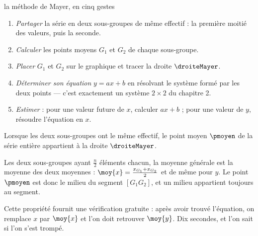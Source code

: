 \begin{methode}{la méthode de Mayer, en cinq gestes}
\begin{enumerate}[label=\textbf{\arabic*.}, leftmargin=*, itemsep=0.15em]
  \item \emph{Partager} la série en deux sous-groupes de même effectif : la
        première moitié des valeurs, puis la seconde.
  \item \emph{Calculer} les points moyens $G_{1}$ et $G_{2}$ de chaque
        sous-groupe.
  \item \emph{Placer} $G_{1}$ et $G_{2}$ sur le graphique et tracer la
        droite $\droiteMayer$.
  \item \emph{Déterminer son équation} $y = ax+b$ en résolvant le système
        formé par les deux points — c'est exactement un système
        $2\times2$ du chapitre 2.
  \item \emph{Estimer} : pour une valeur future de $x$, calculer $ax+b$ ;
        pour une valeur de $y$, résoudre l'équation en $x$.
\end{enumerate}
\end{methode}

\begin{propriete}
Lorsque les deux sous-groupes ont le même effectif, le point moyen
$\pmoyen$ de la série entière appartient à la droite $\droiteMayer$.
\end{propriete}

\begin{demonstration}
Les deux sous-groupes ayant $\frac n2$ éléments chacun, la moyenne générale
est la moyenne des deux moyennes :
$\moy{x} = \frac{x_{G_{1}}+x_{G_{2}}}{2}$ et de même pour $y$. Le point
$\pmoyen$ est donc le milieu du segment $\left[G_{1}G_{2}\right]$, et un
milieu appartient toujours au segment.
\end{demonstration}

\begin{remarque}
Cette propriété fournit une vérification gratuite : après avoir trouvé
l'équation, on remplace $x$ par $\moy{x}$ et l'on doit retrouver $\moy{y}$.
Dix secondes, et l'on sait si l'on s'est trompé.
\end{remarque}

